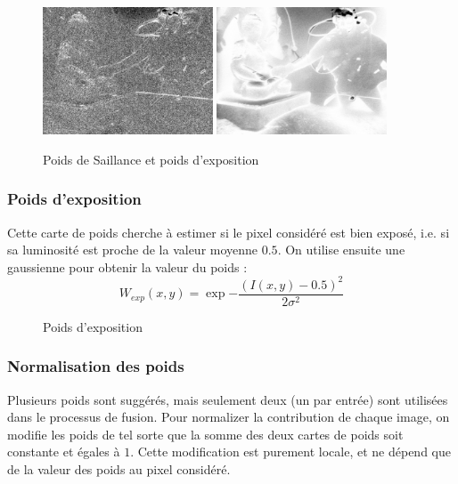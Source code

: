 \documentclass[twoside]{article}
\begin{document}
\begin{figure}[]
  \centering
  \includegraphics[width=0.45\textwidth]{Support/saliency.png}
  \includegraphics[width=0.45\textwidth]{Support/exposedness.png}
  \caption{Poids de Saillance et poids d'exposition}
\end{figure}

\subsubsection{Poids d'exposition}
Cette carte de poids cherche à estimer si le pixel considéré est bien exposé, i.e. si sa luminosité est proche de la valeur moyenne $0.5$. On utilise ensuite une gaussienne pour obtenir la valeur du poids : $$W_{exp}(x,y) = \exp{-\frac{(I(x,y) - 0.5)^2}{2\sigma^2}}$$

\begin{figure}[]
  \centering
  \caption{Poids d'exposition}
\end{figure}

 \subsubsection{Normalisation des poids}
Plusieurs poids sont suggérés, mais seulement deux (un par entrée) sont utilisées dans le processus de fusion. Pour normalizer la contribution de chaque image, on modifie les poids de tel sorte que la somme des deux cartes de poids soit constante et égales à $1$. Cette modification est purement locale, et ne dépend que de la valeur des poids au pixel considéré.
\end{document}
